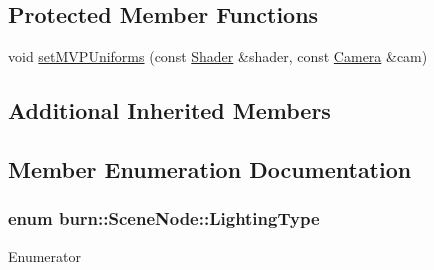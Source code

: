 \subsection*{Protected Member Functions}
\begin{DoxyCompactItemize}
\item 
void \hyperlink{classburn_1_1_scene_node_a2bb492a0906a3e71e5f81c06127e8224}{set\-M\-V\-P\-Uniforms} (const \hyperlink{classburn_1_1_shader}{Shader} \&shader, const \hyperlink{classburn_1_1_camera}{Camera} \&cam)
\end{DoxyCompactItemize}
\subsection*{Additional Inherited Members}


\subsection{Member Enumeration Documentation}
\hypertarget{classburn_1_1_scene_node_ac71667bb8707fdadf6b2245d6e6c85cc}{
\subsubsection[{Lighting\-Type}]{\setlength{\rightskip}{0pt plus 5cm}enum {\bf burn\-::\-Scene\-Node\-::\-Lighting\-Type}}}\label{classburn_1_1_scene_node_ac71667bb8707fdadf6b2245d6e6c85cc}
\begin{Desc}
\item[Enumerator]\par
\begin{description}
\item[{\em 
\hypertarget{classburn_1_1_scene_node_ac71667bb8707fdadf6b2245d6e6c85cca5032b08cd92c6c86c32c088c81922632}{D\-I\-F\-F\-U\-S\-E}\label{classburn_1_1_scene_node_ac71667bb8707fdadf6b2245d6e6c85cca5032b08cd92c6c86c32c088c81922632}
}]\item[{\em 
\hypertarget{classburn_1_1_scene_node_ac71667bb8707fdadf6b2245d6e6c85ccaeec51fea1afff7847dd2acfe45121506}{S\-P\-E\-C\-U\-L\-A\-R}\label{classburn_1_1_scene_node_ac71667bb8707fdadf6b2245d6e6c85ccaeec51fea1afff7847dd2acfe45121506}
}]\end{description}
\end{Desc}


